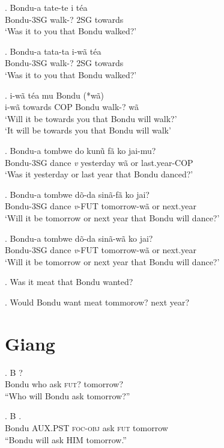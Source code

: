 \documentclass{assets/fieldnotes}
\begin{document}
\exg. Bondu-a tate-te i téa\\
Bondu-3SG walk-? 2SG towards\\
`Was it to you that Bondu walked?'

\exg. Bondu-a tata-ta i-wã téa\\
Bondu-3SG walk-? 2SG towards\\
`Was it to you that Bondu walked?'

\exg. i-wã téa mu Bondu   (*wã)\\
i-wã towards COP Bondu walk-? wã\\
`Will it be towards you that Bondu will walk?'\\
`It will be towards you that Bondu will walk'\\

\exg. Bondu-a tombwe do kunũ fã ko jai-mu?\\
Bondu-3SG dance \textit{v} yesterday wã or last.year-COP\\
`Was it yesterday or last year that Bondu danced?'

\exg. Bondu-a tombwe dõ-da sinã-fã ko jai?\\
Bondu-3SG dance \textit{v}-FUT tomorrow-wã or next.year\\
`Will it be tomorrow or next year that Bondu will dance?'

\exg. Bondu-a tombwe dõ-da sinã-wã ko jai?\\
Bondu-3SG dance \textit{v}-FUT tomorrow-wã or next.year\\
`Will it be tomorrow or next year that Bondu will dance?'

\ex. Was it meat that Bondu wanted?

\ex. Would Bondu want meat tommorow? next year?

\section{Giang}
\exg. B    ?\\
Bondu who ask \textsc{fut?} tomorrow?\\
``Who will Bondu ask tomorrow?''

\exg. B     .\\
Bondu \textsc{AUX.PST} \textsc{foc-obj} ask \textsc{fut} tomorrow\\
``Bondu will ask HIM tomorrow.''
\end{document}
